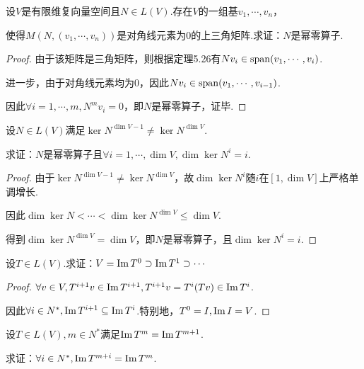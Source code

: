 \newpage

\begin{problem}[12]\label{8.A.12}
    设\(V\)是有限维复向量空间且\(N \in L(V)\).存在\(V\)的一组基\(v_1,\cdots,v_n\)，

    使得\(M(N,(v_1,\cdots,v_n))\)是对角线元素为\(0\)的上三角矩阵.求证：\(N\)是幂零算子.
\end{problem}

\begin{proof}
    由于该矩阵是三角矩阵，则根据定理5.26有\(Nv_i \in \operatorname{span} (v_1,\cdots,v_i)\).

    进一步，由于对角线元素均为\(0\)，因此\(Nv_i \in \operatorname{span} (v_1,\cdots,v_{i-1})\).
    
    因此\(\forall i=1,\cdots,m,N^m v_i=0\)，即\(N\)是幂零算子，证毕.
\end{proof}

\begin{problem}[15]\label{8.A.15}
    设\(N \in L(V)\)满足\(\ker N^{\dim V-1} \ne \ker N^{\dim V}\).

    求证：\(N\)是幂零算子且\(\forall i=1,\cdots,\dim V,\dim \ker N^i=i\).
\end{problem}

\begin{proof}
    由于\(\ker N^{\dim V-1} \ne \ker N^{\dim V}\)，故\(\dim \ker N^i\)随\(i\)在\([1,\dim V]\)上严格单调增长.

    因此\(\dim \ker N<\cdots<\dim \ker N^{\dim V} \leq \dim V\).
    
    得到\(\dim \ker N^{\dim V}=\dim V\)，即\(N\)是幂零算子，且\(\dim \ker N^i=i\).    
\end{proof}

\begin{problem}[16]\label{8.A.16}
    设\(T \in L(V)\).求证：\(V=\operatorname{Im} T^0 \supset \operatorname{Im} T^1 \supset \cdots\)
\end{problem}

\begin{proof}
    \(\forall v \in V,T^{i+1}v \in \operatorname{Im} T^{i+1},T^{i+1}v=T^i(Tv) \in \operatorname{Im} T^i\).

    因此\(\forall i \in N^*,\operatorname{Im} T^{i+1} \subseteq \operatorname{Im} T^i\).特别地，\(T^0=I,\operatorname{Im} I=V\).
\end{proof}

\begin{problem}[17]\label{8.A.17}
    设\(T \in L(V),m \in N^*\)满足\(\operatorname{Im} T^m=\operatorname{Im} T^{m+1}\).
    
    求证：\(\forall i \in N^*,\operatorname{Im} T^{m+i}=\operatorname{Im} T^m\).
\end{problem}

